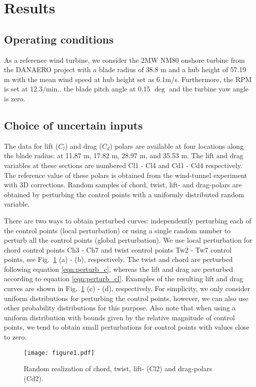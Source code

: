 \section{Results}\label{sec:results}

\subsection{Operating conditions}
As a reference wind turbine, we consider the 2MW NM80 onshore turbine from the DANAERO project \cite{Troldborg2013} with a blade radius of 38.8 m and a hub height of 57.19 m with the mean wind speed at hub height set as 6.1m/s. Furthermore, the RPM is set at 12.3$/\text{min.}$, the blade pitch angle at 0.15 $\deg$ and the turbine yaw angle is zero.

\subsection{Choice of uncertain inputs}
The data for lift ($C_l$) and drag ($C_d$) polars are available at four locations along the blade radius: at 11.87 m, 17.82 m, 28.97 m, and 35.53 m. The lift and drag variables at these sections are numbered Cl1 - Cl4 and Cd1 - Cd4 respectively. The reference value of these polars is obtained from the wind-tunnel experiment with 3D corrections. Random samples of chord, twist, lift- and drag-polars are obtained by perturbing the control points with a uniformly distributed random variable.  

There are two ways to obtain perturbed curves: independently perturbing each of the control points (local perturbation) or using a single random number to perturb all the control points (global perturbation). We use local perturbation for chord control points Ch3 - Ch7 and twist control points Tw2 - Tw7 control points, see Fig.\ \ref{perturbed_samples} (a) - (b), respectively. The twist and chord are perturbed following equation \eqref{eqn:perturb_c}, whereas the lift and drag are perturbed according to equation \eqref{eqn:perturb_cl}. Examples of the resulting lift and drag curves are shown in Fig.\ \ref{perturbed_samples} (c) - (d), respectively. For simplicity, we only consider uniform distributions for perturbing the control points, however, we can also use other probability distributions for this purpose. Also note that when using a uniform distribution with bounds given by the relative magnitude of control points, we tend to obtain small perturbations for control points with values close to zero. 
\begin{figure}[h!]
\centering
\texttt{[image: figure1.pdf]}
\caption{Random realization of chord, twist, lift- (Cl2) and drag-polars (Cd2).}
\label{perturbed_samples}
\end{figure}


